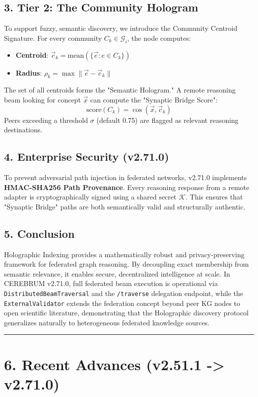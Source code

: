 \subsection*{3. Tier 2: The Community Hologram}
To support fuzzy, semantic discovery, we introduce the Community Centroid Signature. For every community $C_k \in \mathcal{G}_i$, the node computes:
\begin{itemize}
  \item \textbf{Centroid}: $\vec{c}_k = \text{mean}(\{\vec{e} : e \in C_k\})$
  \item \textbf{Radius}: $\rho_k = \max \|\vec{e} - \vec{c}_k\|$
\end{itemize}


The set of all centroids forms the "Semantic Hologram." A remote reasoning beam looking for concept $\vec{x}$ can compute the "Synaptic Bridge Score":
$$\text{score}(C_k) = \cos(\vec{x}, \vec{c}_k)$$
Peers exceeding a threshold $\sigma$ (default 0.75) are flagged as relevant reasoning destinations.

\subsection*{4. Enterprise Security (v2.71.0)}
To prevent adversarial path injection in federated networks, v2.71.0 implements \textbf{HMAC-SHA256 Path Provenance}. Every reasoning response from a remote adapter is cryptographically signed using a shared secret $\mathcal{K}$. This ensures that "Synaptic Bridge" paths are both semantically valid and structurally authentic.

\subsection*{5. Conclusion}
Holographic Indexing provides a mathematically robust and privacy-preserving framework for federated graph reasoning. By decoupling exact membership from semantic relevance, it enables secure, decentralized intelligence at scale. In CEREBRUM v2.71.0, full federated beam execution is operational via \texttt{DistributedBeamTraversal} and the \texttt{/traverse} delegation endpoint, while the \texttt{ExternalValidator} extends the federation concept beyond peer KG nodes to open scientific literature, demonstrating that the Holographic discovery protocol generalizes naturally to heterogeneous federated knowledge sources.

\medskip\noindent\rule{\linewidth}{0.4pt}\medskip

\section*{6. Recent Advances (v2.51.1 -> v2.71.0)}

